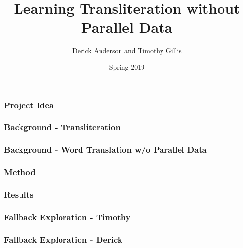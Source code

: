 \documentclass{beamer}
\title{Learning Transliteration without Parallel Data}
\author{Derick Anderson and Timothy Gillis}
\date{Spring 2019}
\begin{document}
 
\frame{\titlepage}
 
\begin{frame}
  \frametitle{Project Idea}

\end{frame}

\begin{frame}
  \frametitle{Background - Transliteration}

\end{frame}

\begin{frame}
  \frametitle{Background - Word Translation w/o Parallel Data}

\end{frame}

\begin{frame}
  \frametitle{Method}
\end{frame}

\begin{frame}
  \frametitle{Results}
\end{frame}

\begin{frame}
  \frametitle{Fallback Exploration - Timothy}
\end{frame}

\begin{frame}
  \frametitle{Fallback Exploration - Derick}
\end{frame}
\end{document}
